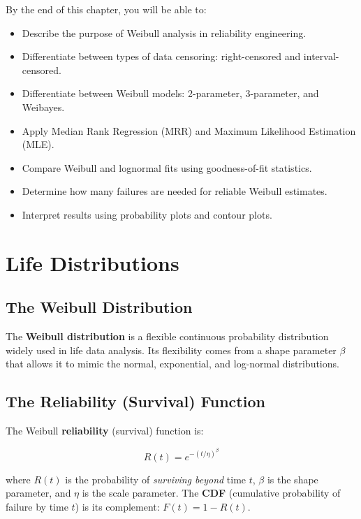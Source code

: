 \documentclass[
  letterpaper,
  DIV=11,
  numbers=noendperiod]{scrreprt}
\providecommand{\tightlist}{%
  \setlength{\itemsep}{0pt}\setlength{\parskip}{0pt}}
\begin{document}
By the end of this chapter, you will be able to:

\begin{itemize}
\tightlist
\item
  Describe the purpose of Weibull analysis in reliability engineering.
\item
  Differentiate between types of data censoring: right-censored and
  interval-censored.
\item
  Differentiate between Weibull models: 2-parameter, 3-parameter, and
  Weibayes.
\item
  Apply Median Rank Regression (MRR) and Maximum Likelihood Estimation
  (MLE).
\item
  Compare Weibull and lognormal fits using goodness-of-fit statistics.
\item
  Determine how many failures are needed for reliable Weibull estimates.
\item
  Interpret results using probability plots and contour plots.
\end{itemize}

\section{Life Distributions}\label{life-distributions}

\subsection{The Weibull Distribution}\label{the-weibull-distribution}

The \textbf{Weibull distribution} is a flexible continuous probability
distribution widely used in life data analysis. Its flexibility comes
from a shape parameter \(\beta\) that allows it to mimic the normal,
exponential, and log-normal distributions.

\subsection{The Reliability (Survival)
Function}\label{the-reliability-survival-function}

The Weibull \textbf{reliability} (survival) function is:

\[R(t) = e^{-(t/\eta)^\beta}\]

where \(R(t)\) is the probability of \emph{surviving beyond} time \(t\),
\(\beta\) is the shape parameter, and \(\eta\) is the scale parameter.
The \textbf{CDF} (cumulative probability of failure by time \(t\)) is
its complement: \(F(t) = 1 - R(t)\).
\end{document}
